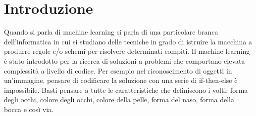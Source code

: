 \documentclass[12pt,italian]{report}
\begin{document}
\frontespizio
\beforepreface

% 
%

         
% 
%


%
%


%
%

\afterpreface

% 
% 

\chapter*{Introduzione}
Quando si parla di machine learning si parla di una particolare branca dell'informatica in cui si studiano delle tecniche in grado di istruire la macchina a produrre regole e/o schemi per risolvere determinati compiti. Il machine learning è stato introdotto per la ricerca di soluzioni a problemi che comportano elevata complessità a livello di codice. 
Per esempio nel riconoscimento di oggetti in un'immagine, pensare di codificare la soluzione con una serie di if-then-else è impossibile. Basti pensare a tutte le caratteristiche che definiscono i volti: forma degli occhi, colore degli occhi, colore della pelle, forma del naso, forma della bocca e così via. 
\end{document}
